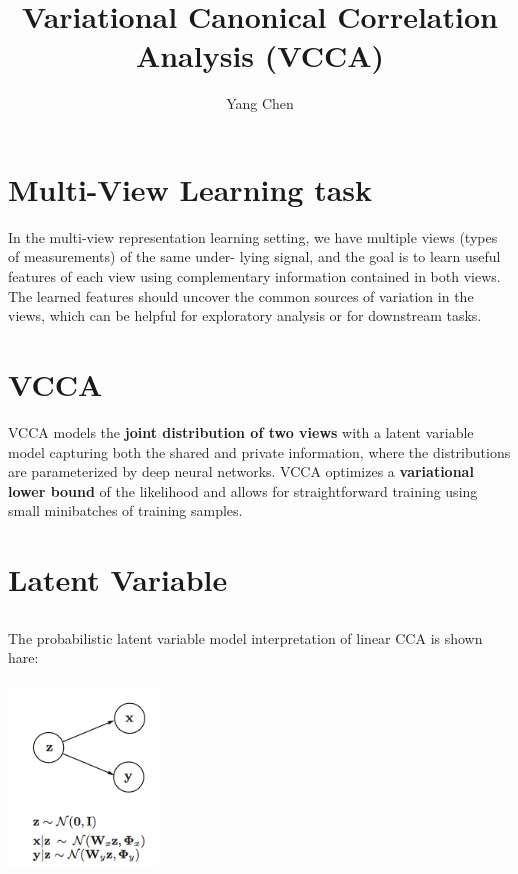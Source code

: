 \documentclass[a4paper]{article}
\begin{document}

\title{Variational Canonical Correlation Analysis (VCCA)} %
\author{Yang Chen} %
\maketitle
\section{Multi-View Learning task}
In the multi-view representation learning setting, we have multiple views (types of measurements) of the same under- lying signal, and the goal is to learn useful features of each view using complementary information contained in both views. The learned features should uncover the common sources of variation in the views, which can be helpful for exploratory analysis or for downstream tasks.
\section{VCCA}
VCCA models the {\bf joint distribution of two views} with a latent variable model capturing both the shared and private information, where the distributions are parameterized by deep neural networks. VCCA optimizes a {\bf variational lower bound} of the likelihood and allows for straightforward training using small minibatches of training samples.
\section{Latent Variable}
\subsection{}

The probabilistic latent variable model interpretation of linear CCA is shown hare:

\begin{center}
\includegraphics[width=4cm, height=5cm]{lat.png}
\end{center}
\end{document}
